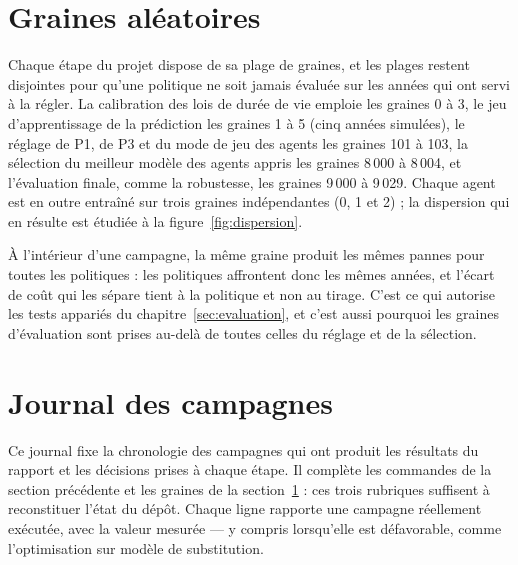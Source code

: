 \documentclass[11pt,a4paper,oneside]{report}
\begin{document}
\section{Graines aléatoires}\label{sec:graines}

Chaque étape du projet dispose de sa plage de graines, et les plages restent disjointes pour qu'une politique ne soit jamais évaluée sur les années qui ont servi à la régler. La calibration des lois de durée de vie emploie les graines 0 à 3, le jeu d'apprentissage de la prédiction les graines 1 à 5 (cinq années simulées), le réglage de P1, de P3 et du mode de jeu des agents les graines 101 à 103, la sélection du meilleur modèle des agents appris les graines 8\,000 à 8\,004, et l'évaluation finale, comme la robustesse, les graines 9\,000 à 9\,029. Chaque agent est en outre entraîné sur trois graines indépendantes (0, 1 et 2) ; la dispersion qui en résulte est étudiée à la figure~\ref{fig:dispersion}.

À l'intérieur d'une campagne, la même graine produit les mêmes pannes pour toutes les politiques : les politiques affrontent donc les mêmes années, et l'écart de coût qui les sépare tient à la politique et non au tirage. C'est ce qui autorise les tests appariés du chapitre~\ref{sec:evaluation}, et c'est aussi pourquoi les graines d'évaluation sont prises au-delà de toutes celles du réglage et de la sélection.

\section{Journal des campagnes}\label{sec:journal}

Ce journal fixe la chronologie des campagnes qui ont produit les résultats du rapport et les
décisions prises à chaque étape. Il complète les commandes de la section précédente et les graines
de la section~\ref{sec:graines} : ces trois rubriques suffisent à reconstituer l'état du dépôt.
Chaque ligne rapporte une campagne réellement exécutée, avec la valeur mesurée — y compris
lorsqu'elle est défavorable, comme l'optimisation sur modèle de substitution.
\end{document}
